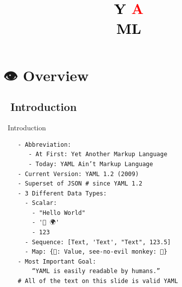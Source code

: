 \documentclass{beamer}
\title{\texorpdfstring{\vspace{2cm}\\
       \hspace{-3mm}\textbf{\textcolor{black}{Y}
       \hspace{-3.6mm}\textcolor{red}{A}\\[-10pt]
       \hspace{+3mm}\textcolor{black}{ML}}\vspace{-1cm}}{YAML}}
\date{\textit{\Subject}}
\begin{document}
{
  \begin{frame}[plain]
      \titlepage
  \end{frame}
}

\section{👁 Overview}
\subsection{🐪 Introduction}

\begin{frame}[fragile]{🐪 Introduction}
  \begin{verbatim}
    - Abbreviation:
       - At First: Yet Another Markup Language
       - Today: YAML Ain’t Markup Language
    - Current Version: YAML 1.2 (2009)
    - Superset of JSON # since YAML 1.2
    - 3 Different Data Types:
      - Scalar:
        - "Hello World"
        - '👋 🌍'
        - 123
      - Sequence: [Text, 'Text', "Text", 123.5]
      - Map: {🔑: Value, see-no-evil monkey: 🙈}
    - Most Important Goal:
        “YAML is easily readable by humans.”
    # All of the text on this slide is valid YAML
  \end{verbatim}
\end{frame}
\end{document}
